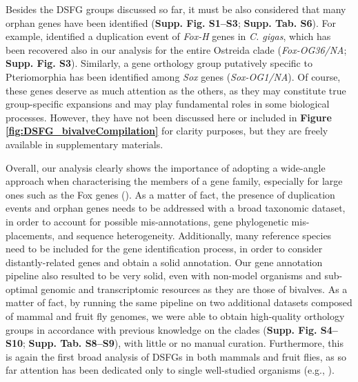 \documentclass[../main.tex]{subfiles}
\begin{document}
Besides the DSFG groups discussed so far, it must be also considered that many orphan genes have been identified (\textbf{Supp. Fig. S1--S3}; \textbf{Supp. Tab. S6}). For example, \textbf{\cite{wu2020identification}} identified a duplication event of \textit{Fox-H} genes in \textit{C. gigas}, which has been recovered also in our analysis for the entire Ostreida clade (\textit{Fox-OG36/NA}; \textbf{Supp. Fig. S3}). Similarly, a gene orthology group putatively specific to Pteriomorphia has been identified among \textit{Sox} genes (\textit{Sox-OG1/NA}). Of course, these genes deserve as much attention as the others, as they may constitute true group-specific expansions and may play fundamental roles in some biological processes. However, they have not been discussed here or included in \textbf{Figure \ref{fig:DSFG_bivalveCompilation}} for clarity purposes, but they are freely available in supplementary materials.

Overall, our analysis clearly shows the importance of adopting a wide-angle approach when characterising the members of a gene family, especially for large ones such as the Fox genes (\textbf{\cite{schomburg2022phylogenetic}}). As a matter of fact, the presence of duplication events and orphan genes needs to be addressed with a broad taxonomic dataset, in order to account for possible mis-annotations, gene phylogenetic mis-placements, and sequence heterogeneity. Additionally, many reference species need to be included for the gene identification process, in order to consider distantly-related genes and obtain a solid annotation. Our gene annotation pipeline also resulted to be very solid, even with non-model organisms and sub-optimal genomic and transcriptomic resources as they are those of bivalves. As a matter of fact, by running the same pipeline on two additional datasets composed of mammal and fruit fly genomes, we were able to obtain high-quality orthology groups in accordance with previous knowledge on the clades (\textbf{Supp. Fig. S4--S10}; \textbf{Supp. Tab. S8--S9}), with little or no manual curation. Furthermore, this is again the first broad analysis of DSFGs in both mammals and fruit flies, as so far attention has been dedicated only to single well-studied organisms (e.g., \textbf{\cite{jackson2010update}}).
\end{document}
